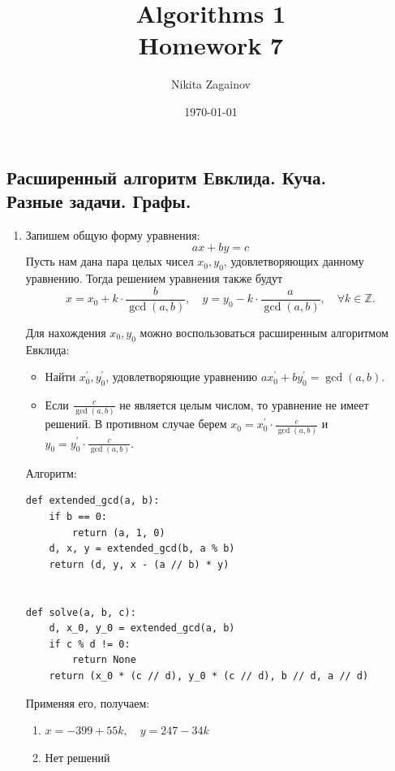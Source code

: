 \documentclass{article}
\title{Algorithms 1 \\ Homework 7}
\author{Nikita Zagainov}
\date{\selectlanguage{english}\today}
\begin{document}
\maketitle

\begin{center}
	\section*{Расширенный алгоритм Евклида. Куча. \\
	  Разные задачи. Графы.}
\end{center}
\begin{enumerate}
	\item
	      Запишем общую форму уравнения:
	      \[
		      ax + by = c
	      \]
	      Пусть нам дана пара целых чисел $x_0, y_0$,
	      удовлетворяющих данному уравнению. Тогда решением
	      уравнения также будут
	      \[
		      x = x_0 + k \cdot \frac{b}{\gcd(a, b)},
		      \quad y = y_0 - k \cdot \frac{a}{\gcd(a, b)}, \quad \forall k \in \mathbb{Z}.
	      \]

	      Для нахождения $x_0, y_0$ можно воспользоваться
	      расширенным алгоритмом Евклида:
	      \begin{itemize}
		      \item Найти $x_0^{\prime}, y_0^{\prime}$,
		            удовлетворяющие уравнению
		            $ax_0^{\prime} + by_0^{\prime} =
			            \gcd(a, b)$.
		      \item Если $\frac{c}{\gcd(a, b)}$
		            не является целым числом,
		            то уравнение не имеет решений.
		            В противном случае
		            берем $x_0 = x_0^{\prime}
			            \cdot \frac{c}{\gcd(a, b)}$ и
		            $y_0 = y_0^{\prime} \cdot
			            \frac{c}{\gcd(a, b)}$.
	      \end{itemize}

	      Алгоритм:
	      \begin{lstlisting}
def extended_gcd(a, b):
    if b == 0:
        return (a, 1, 0)
    d, x, y = extended_gcd(b, a % b)
    return (d, y, x - (a // b) * y)


def solve(a, b, c):
    d, x_0, y_0 = extended_gcd(a, b)
    if c % d != 0:
        return None
    return (x_0 * (c // d), y_0 * (c // d), b // d, a // d)
        \end{lstlisting}

	      Применяя его, получаем:
	      \begin{enumerate}
		      \item[1.] $x = -399 + 55k, \quad y = 247 - 34k$
		      \item[2.] Нет решений
	      \end{enumerate}


\end{enumerate}
\end{document}
